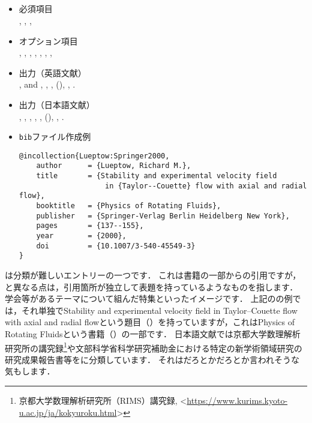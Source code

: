\documentclass[a4paper,fleqn,uplatex,dvipdfmx]{jsarticle}
\begin{document}
\subsection{\ttincollection}
\label{ssec:incollection}
\begin{screen}
    \begin{itemize}
        \item 必須項目 \\
        \ttauthor, \tttitle, \ttbooktitle, \ttyear
        \item オプション項目 \\
        \tteditor, \ttpages, \ttorganization, \ttpublisher, \ttaddress, \ttmonth, \ttnote, \ttkey
        \item 出力（英語文献） \\
            \colorbox[gray]{0.8}{\ttauthorf}, \colorbox[gray]{0.8}{\ttauthors} and \colorbox[gray]{0.8}{\ttauthort}, \colorbox[gray]{0.8}{\tttitle}, \colorbox[gray]{0.8}{\ttbooktitle}, \colorbox[gray]{0.8}{\ttpublisher} (\colorbox[gray]{0.8}{\ttyear}), \colorbox[gray]{0.8}{\ttpages}, \colorbox[gray]{0.8}{\ttnote}.
        \item 出力（日本語文献） \\
            \colorbox[gray]{0.8}{\ttauthorf}, \colorbox[gray]{0.8}{\ttauthors}, \colorbox[gray]{0.8}{\ttauthort}, \colorbox[gray]{0.8}{\tttitle}, \colorbox[gray]{0.8}{\ttbooktitle}, \colorbox[gray]{0.8}{\ttpublisher} (\colorbox[gray]{0.8}{\ttyear}), \colorbox[gray]{0.8}{\ttpages}, \colorbox[gray]{0.8}{\ttnote}.
        \item \verb|bib|ファイル作成例 \vspace{-3mm}
\begin{verbatim}
@incollection{Lueptow:Springer2000,
    author      = {Lueptow, Richard M.},
    title       = {Stability and experimental velocity field 
                    in {Taylor--Couette} flow with axial and radial flow},
    booktitle   = {Physics of Rotating Fluids},
    publisher   = {Springer-Verlag Berlin Heidelberg New York},
    pages       = {137--155},
    year        = {2000},
    doi         = {10.1007/3-540-45549-3}
}
\end{verbatim}
    \end{itemize}
\end{screen}

\ttincollection は分類が難しいエントリーの一つです．
これは書籍の一部からの引用ですが，\hyperref[ssec:inbook]{\ttinbook}と異なる点は，引用箇所が独立して表題を持っているようなものを指します．
学会等があるテーマについて組んだ特集といったイメージです．
上記の\citet{Lueptow:Springer2000}の例では，それ単独でStability and experimental velocity field in Taylor--Couette flow with axial and radial flowという題目（\tttitle）を持っていますが，これはPhysics of Rotating Fluidsという書籍（\ttbooktitle）の一部です．
日本語文献では京都大学数理解析研究所の講究録\footnote{京都大学数理解析研究所（RIMS）講究録, \textless\url{https://www.kurims.kyoto-u.ac.jp/ja/kokyuroku.html}\textgreater}や文部科学省科学研究補助金における特定の新学術領域研究の研究成果報告書等を\ttincollection に分類しています．
それは\hyperref[ssec:inproceedings]{\ttinproceedings}だろとか\hyperref[ssec:techreport]{\tttechreport}だろとか言われそうな気もします．
\end{document}

